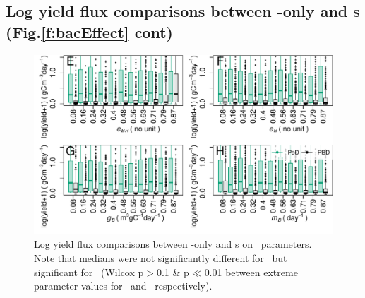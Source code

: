 \documentclass[../thesis.tex]{subfiles} %
\begin{document}
\subsection{Log yield flux comparisons between \phy-only and \pbs s (Fig.\ref{f:bacEffect} cont)}
\begin{figure}[H]
    \centering
    \includegraphics[width=.95\linewidth]{result/bacEff2.pdf}
    \caption[Log yield flux comparisons between feasible \phy-only and \pbs s (Fig.\ref{f:bacEffect} cont)]{Log yield flux comparisons between \phy-only and \pbs s on \bac\ parameters.  Note that medians were not significantly different for \PoN\ but significant for \PBN\ (Wilcox p$>$0.1 \& p$\ll$0.01 between extreme parameter values for \PoN\ and \PBN\ respectively).\lnExplain}
    \label{f:bacEffect2}
\end{figure}
\end{document}
